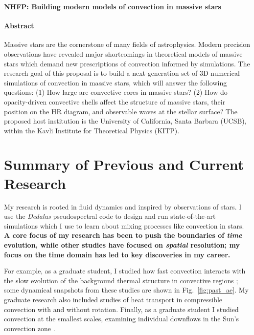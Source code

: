 \documentclass[12pt]{article} %
\begin{document}

\centerline{\bf\large NHFP: Building modern models of convection in massive stars}

\paragraph{Abstract}
Massive stars are the cornerstone of many fields of astrophysics. 
Modern precision observations have revealed major shortcomings in theoretical models of massive stars which demand new prescriptions of convection informed by simulations. 
The research goal of this proposal is to build a next-generation set of 3D numerical simulations of convection in massive stars, which will answer the following questions:
(1) How large are convective cores in massive stars?
(2) How do opacity-driven convective shells affect the structure of massive stars, their position on the HR diagram, and observable waves at the stellar surface?
The proposed host institution is the University of California, Santa Barbara (UCSB), within the Kavli Institute for Theoretical Physics (KITP). 

\setcounter{section}{0}

\section{Summary of Previous and Current Research}
My research is rooted in fluid dynamics and inspired by observations of stars.
I use the \emph{Dedalus} \citep{burns_etal_2020} pseudospectral code to design and run state-of-the-art simulations which I use to learn about mixing processes like convection in stars.
\textbf{A core focus of my research has been to push the boundaries of \emph{time} evolution, while other studies have focused on \emph{spatial} resolution; my focus on the time domain has led to key discoveries in my career.}

For example, as a graduate student, I studied how fast convection interacts with the slow evolution of the background thermal structure in convective regions \citep{anders_etal_2018,anders_etal_2020}; some dynamical snapshots from these studies are shown in Fig.~\ref{fig:past_ae}.
My graduate research also included studies of heat transport in compressible convection with  \citep{anders_etal_2019_rot} and without \citep{anders_brown_2017} rotation.
Finally, as a graduate student I studied convection at the smallest scales, examining individual downflows in the Sun's convection zone \citep{anders_etal_2019_thermals}.
\end{document}
